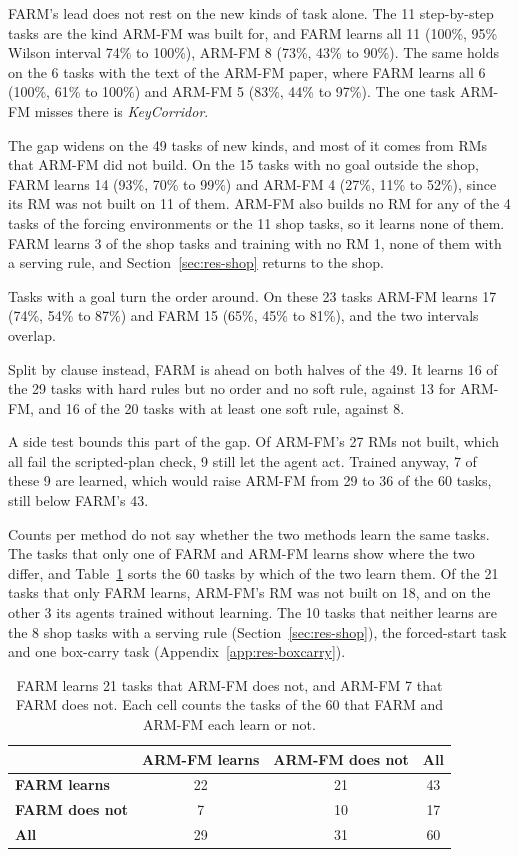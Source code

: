 \documentclass[11pt,english,listoffigures,listoftables]{tfgetsinf}
\newcommand{\env}[1]{\textsf{\slshape #1}}  %
\begin{document}
FARM's lead does not rest on the new kinds of task alone. The 11 step-by-step tasks are the kind ARM-FM was built for, and FARM learns all 11 (100\%, 95\% Wilson interval 74\% to 100\%), ARM-FM 8 (73\%, 43\% to 90\%). The same holds on the 6 tasks with the text of the ARM-FM paper, where FARM learns all 6 (100\%, 61\% to 100\%) and ARM-FM 5 (83\%, 44\% to 97\%). The one task ARM-FM misses there is \env{KeyCorridor}.

The gap widens on the 49 tasks of new kinds, and most of it comes from RMs that ARM-FM did not build. On the 15 tasks with no goal outside the shop, FARM learns 14 (93\%, 70\% to 99\%) and ARM-FM 4 (27\%, 11\% to 52\%), since its RM was not built on 11 of them. ARM-FM also builds no RM for any of the 4 tasks of the forcing environments or the 11 shop tasks, so it learns none of them. FARM learns 3 of the shop tasks and training with no RM 1, none of them with a serving rule, and Section~\ref{sec:res-shop} returns to the shop.

Tasks with a goal turn the order around. On these 23 tasks ARM-FM learns 17 (74\%, 54\% to 87\%) and FARM 15 (65\%, 45\% to 81\%), and the two intervals overlap.

Split by clause instead, FARM is ahead on both halves of the 49. It learns 16 of the 29 tasks with hard rules but no order and no soft rule, against 13 for ARM-FM, and 16 of the 20 tasks with at least one soft rule, against 8.

A side test bounds this part of the gap. Of ARM-FM's 27 RMs not built, which all fail the scripted-plan check, 9 still let the agent act. Trained anyway, 7 of these 9 are learned, which would raise ARM-FM from 29 to 36 of the 60 tasks, still below FARM's 43.

Counts per method do not say whether the two methods learn the same tasks. The tasks that only one of FARM and ARM-FM learns show where the two differ, and Table~\ref{tab:res-h2h} sorts the 60 tasks by which of the two learn them. Of the 21 tasks that only FARM learns, ARM-FM's RM was not built on 18, and on the other 3 its agents trained without learning. The 10 tasks that neither learns are the 8 shop tasks with a serving rule (Section~\ref{sec:res-shop}), the forced-start task and one box-carry task (Appendix~\ref{app:res-boxcarry}).

\begin{table}[!htb]
\centering
\footnotesize
\renewcommand{\arraystretch}{1.2}
\begin{tabular}{@{}lccc@{}}
\toprule
 & \textbf{ARM-FM learns} & \textbf{ARM-FM does not} & \textbf{All} \\ \midrule
\textbf{FARM learns} & 22 & 21 & 43 \\
\textbf{FARM does not} & 7 & 10 & 17 \\ \midrule
\textbf{All} & 29 & 31 & 60 \\ \bottomrule
\end{tabular}
\caption[Head-to-head of FARM and ARM-FM]{FARM learns 21 tasks that ARM-FM does not, and ARM-FM 7 that FARM does not. Each cell counts the tasks of the 60 that FARM and ARM-FM each learn or not.}
\label{tab:res-h2h}
\end{table}
\end{document}
